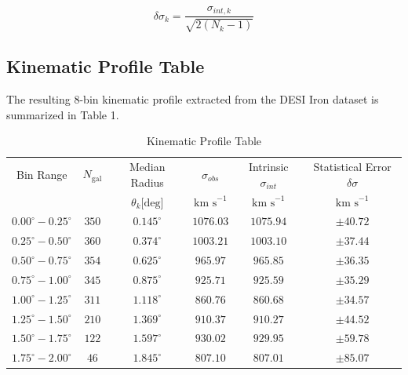 \documentclass[twocolumn]{aastex631}
\begin{document}
\begin{equation}
	\delta\sigma_{k}= \frac{\sigma_{int,k}}{\sqrt{2(N_{k}-1)}}
\end{equation}

\subsection{Kinematic Profile Table}

The resulting 8-bin kinematic profile extracted from the DESI Iron dataset is summarized in Table 1.

\begin{table}[ht!]
	\centering
	\caption{Kinematic Profile Table}
	\label{tab:kinematic_profile}
	\begin{tabular}{cccccc}
		\hline \hline
		Bin Range                   & $N_{\text{gal}}$ & Median Radius            & $\sigma_{obs}$     & Intrinsic $\sigma_{int}$ & Statistical Error $\delta\sigma$ \\
		                            &                  & $\theta_{k}\text{[deg]}$ & $\text{km s}^{-1}$ & $\text{km s}^{-1}$       & $\text{km s}^{-1}$               \\
		\hline
		$0.00^{\circ}-0.25^{\circ}$ & $350$            & $0.145^{\circ}$          & $1076.03$          & $1075.94$                & $\pm 40.72$                      \\
		$0.25^{\circ}-0.50^{\circ}$ & $360$            & $0.374^{\circ}$          & $1003.21$          & $1003.10$                & $\pm 37.44$                      \\
		$0.50^{\circ}-0.75^{\circ}$ & $354$            & $0.625^{\circ}$          & $965.97$           & $965.85$                 & $\pm 36.35$                      \\
		$0.75^{\circ}-1.00^{\circ}$ & $345$            & $0.875^{\circ}$          & $925.71$           & $925.59$                 & $\pm 35.29$                      \\
		$1.00^{\circ}-1.25^{\circ}$ & $311$            & $1.118^{\circ}$          & $860.76$           & $860.68$                 & $\pm 34.57$                      \\
		$1.25^{\circ}-1.50^{\circ}$ & $210$            & $1.369^{\circ}$          & $910.37$           & $910.27$                 & $\pm 44.52$                      \\
		$1.50^{\circ}-1.75^{\circ}$ & $122$            & $1.597^{\circ}$          & $930.02$           & $929.95$                 & $\pm 59.78$                      \\
		$1.75^{\circ}-2.00^{\circ}$ & $46$             & $1.845^{\circ}$          & $807.10$           & $807.01$                 & $\pm 85.07$                      \\

		\hline
	\end{tabular}
\end{table}
\end{document}
